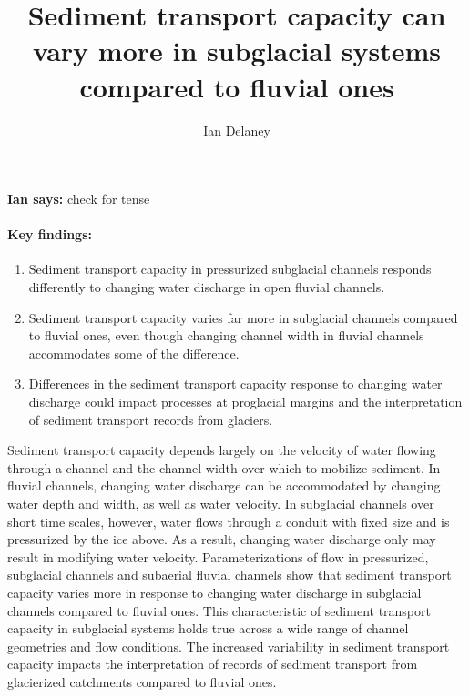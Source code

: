 \documentclass[11pt]{article}
\author[1]{Ian Delaney}
\affil[1]{Institut des dynamiques de la surface terrestre (IDYST), Universit\'{e} de Lausanne, B\^{a}timent G\'{e}opolis, CH-1015 Lausanne}
\title{Sediment transport capacity can vary more in subglacial systems compared to fluvial ones}
\newcommand{\ian}[1]{{\textbf{\color{blue}Ian says:} \color{blue} #1} }
\begin{document}
\maketitle

\ian{check for tense}

\paragraph{Key findings:}
\begin{enumerate}
\item Sediment transport capacity in pressurized subglacial channels  responds differently to changing water discharge in open fluvial channels.
\item Sediment transport capacity varies far more in subglacial channels compared to fluvial ones, even though changing channel width  in fluvial channels accommodates some of the difference.
\item Differences in the sediment transport capacity response to changing water discharge could impact processes at proglacial margins and the interpretation of sediment transport records from glaciers. 
\end{enumerate}

\abstract %
Sediment transport capacity depends largely on the velocity of water flowing through a channel and the channel width over which to mobilize sediment.
In fluvial channels, changing water discharge can be accommodated by changing water depth and width, as well as water velocity.
In subglacial channels over short time scales, however, water flows through a conduit with fixed size and is pressurized by the ice above.
As a result, changing water discharge only may result in modifying water velocity.
Parameterizations of flow in pressurized, subglacial channels and  subaerial fluvial channels show that sediment transport capacity varies  more in response to changing water discharge in subglacial channels compared to fluvial ones.
This characteristic of sediment transport capacity in subglacial systems holds true  across a wide range of channel geometries and flow conditions.
The increased variability in sediment transport capacity impacts the interpretation of records of sediment transport from glacierized catchments compared to fluvial ones. 

\vspace{0.5cm}
\end{document}

